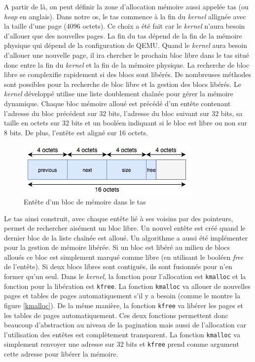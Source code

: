 A partir de là, on peut définir la zone d'allocation mémoire aussi appelée tas
(ou \textit{heap} en anglais). Dans notre \acrshort{os}, le tas commence à la
fin du \textit{kernel} allignée avec la taille d'une page (4096 octets). Ce choix
a été fait car le \textit{kernel} n'aura besoin d'allouer que des nouvelles
pages. La fin du tas dépend de la fin de la mémoire physique qui dépend de la
configuration de QEMU. Quand le \textit{kernel} aura besoin d'allouer une nouvelle
page, il ira chercher le prochain bloc libre dans le tas situé donc entre la fin
du \textit{kernel} et la fin de la mémoire physique. La recherche de bloc libre
se complexifie rapidement si des blocs sont libérés. De nombreuses méthodes sont
possibles pour la recherche de bloc libre et la gestion des blocs libérés. Le
\textit{kernel} développé utilise une liste doublement chaînée pour gérer la
mémoire dynamique. Chaque bloc mémoire alloué est précédé d'un entête contenant
l'adresse du bloc précédent sur 32 bits, l'adresse du bloc suivant sur 32 bits,
sa taille en octets sur 32 bits et un booléen indiquant si le bloc est libre ou
non sur 8 bits. De plus, l'entête est aligné sur 16 octets.

\begin{figure}[!h]
  \centering
  \includegraphics[scale=0.7]{images/heap_header.png}
  \caption{Entête d'un bloc de mémoire dans le tas}
  \label{heap_header}
\end{figure}

Le tas ainsi construit, avec chaque entête lié à ses voisins par des pointeurs,
permet de rechercher aisément un bloc libre. Un nouvel entête est créé quand le
dernier bloc de la liste chaînée est alloué. Un algorithme a aussi été implémenter
pour la gestion de mémoire libérée. Si un bloc est libéré au milieu de blocs
alloués ce bloc est simplement marqué comme libre (en utilisant le booléen \textit{free}
de l'entête). Si deux blocs libres sont contiguës, ils sont fusionnés pour n'en
former qu'un seul. Dans le \textit{kernel}, la fonction pour l'allocation est
\texttt{kmalloc} et la fonction pour la libération est \texttt{kfree}.
La fonction \texttt{kmalloc} va allouer de nouvelles pages et tables
de pages automatiquement s'il y a besoin (comme le montre la figure \ref{kmalloc}).
De la même manière, la fonction \texttt{kfree} va libérer les pages et
les tables de pages automatiquement. Ces deux fonctions permettent donc beaucoup
d'abstraction au niveau de la pagination mais aussi de l'allocation car l'utilisation
des entêtes est complètement transparent. La fonction \texttt{kmalloc}
va simplement renvoyer une adresse sur 32 bits et \texttt{kfree} prend
comme argument cette adresse pour libérer la mémoire.

